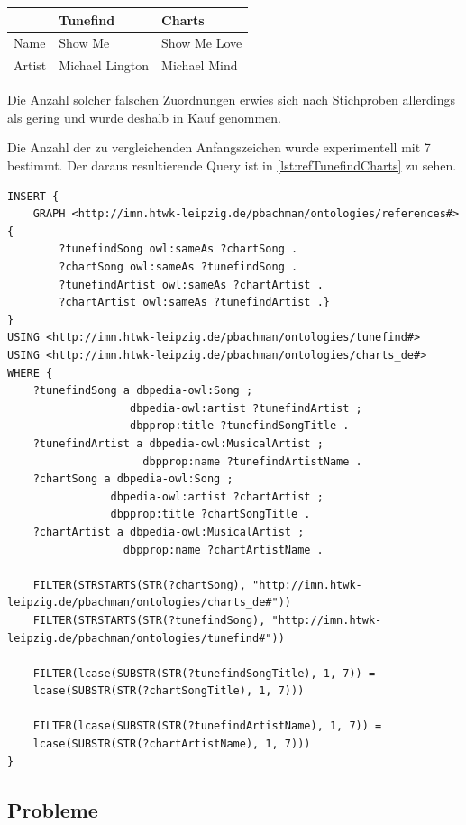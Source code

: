 \documentclass[parskip]{scrartcl}
\begin{document}
\begin{tabular}{p{}|p{}|p{}}
    & \textbf{Tunefind} & \textbf{Charts} \\\hline
    Name & Show Me  & Show Me Love\\
    Artist & Michael Lington & Michael Mind\\
\end{tabular}

Die Anzahl solcher falschen Zuordnungen erwies sich nach Stichproben allerdings als gering und wurde deshalb in Kauf genommen.

Die Anzahl der zu vergleichenden Anfangszeichen wurde experimentell mit 7 bestimmt. Der daraus resultierende Query ist in \autoref{lst:refTunefindCharts} zu sehen.

\begin{lstlisting}[caption={SPARQL-Query zur Referenzierung von Tunefind und Charts}, label={lst:refTunefindCharts}]
INSERT {
    GRAPH <http://imn.htwk-leipzig.de/pbachman/ontologies/references#> { 
        ?tunefindSong owl:sameAs ?chartSong .
        ?chartSong owl:sameAs ?tunefindSong .        
        ?tunefindArtist owl:sameAs ?chartArtist .
        ?chartArtist owl:sameAs ?tunefindArtist .}
}
USING <http://imn.htwk-leipzig.de/pbachman/ontologies/tunefind#>
USING <http://imn.htwk-leipzig.de/pbachman/ontologies/charts_de#>
WHERE {
    ?tunefindSong a dbpedia-owl:Song ;
                   dbpedia-owl:artist ?tunefindArtist ;
                   dbpprop:title ?tunefindSongTitle .
    ?tunefindArtist a dbpedia-owl:MusicalArtist ;
                     dbpprop:name ?tunefindArtistName .
    ?chartSong a dbpedia-owl:Song ;
                dbpedia-owl:artist ?chartArtist ;
                dbpprop:title ?chartSongTitle .
    ?chartArtist a dbpedia-owl:MusicalArtist ;
                  dbpprop:name ?chartArtistName .
    
    FILTER(STRSTARTS(STR(?chartSong), "http://imn.htwk-leipzig.de/pbachman/ontologies/charts_de#"))
    FILTER(STRSTARTS(STR(?tunefindSong), "http://imn.htwk-leipzig.de/pbachman/ontologies/tunefind#"))
    
    FILTER(lcase(SUBSTR(STR(?tunefindSongTitle), 1, 7)) =
    lcase(SUBSTR(STR(?chartSongTitle), 1, 7)))
    
    FILTER(lcase(SUBSTR(STR(?tunefindArtistName), 1, 7)) =
    lcase(SUBSTR(STR(?chartArtistName), 1, 7)))
}
\end{lstlisting}

\subsection{Probleme}
\label{subsec:problems}
\end{document}
